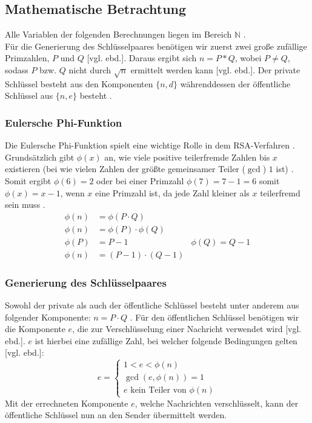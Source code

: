 \documentclass[a4paper,ngerman, headheight=28pt,12pt]{scrartcl}
\newcommand{\vcite}[1]{\cite[vgl.][]{#1}}
\newcommand{\vebd}{[vgl. ebd.]}
\begin{document}
\subsection{Mathematische Betrachtung}
Alle Variablen der folgenden Berechnungen liegen im Bereich $\mathbb{N}$ \vcite{RsaGenCond}. \\
Für die Generierung des Schlüsselpaares benötigen wir zuerst zwei große zufällige Primzahlen, $P$ und $Q$ \vebd. Daraus ergibt sich $n = P * Q$, wobei $P \neq Q$, sodass $P$ bzw. $Q$ nicht durch $\sqrt{n}$ ermittelt werden kann \vebd. Der private Schlüssel besteht aus den Komponenten $\{ n, d \}$ währenddessen der öffentliche Schlüssel aus $\{ n, e \}$ besteht \vcite{RsaVariables}.
\subsubsection{Eulersche Phi-Funktion}
Die Eulersche Phi-Funktion spielt eine wichtige Rolle in dem RSA-Verfahren \vcite{TotientFuncMultiplicative}. Grundsätzlich gibt $\phi(x)$ an, wie viele positive teilerfremde Zahlen bis $x$ existieren (bei wie vielen Zahlen der größte gemeinsamer Teiler ($\gcd$) $1$ ist) \vcite{EulersTotientFunction}. Somit ergibt $\phi(6) = 2$  oder bei einer Primzahl $\phi(7) = 7 - 1 = 6$ somit $\phi(x) = x-1$, wenn $x$ eine Primzahl ist, da jede Zahl kleiner als $x$ teilerfremd sein muss \vcite{TotientFuncMultiplicative}.
\begin{equation*}
  \begin{aligned}
    \phi(n) & = \phi(P \cdot Q)                                                \\
    \phi(n) & = \phi(P) \cdot \phi(Q)                                          \\
    \phi(P) & = P -1                                          & \phi(Q) = Q -1 \\
    \phi(n) & = \left(P - 1 \right) \cdot \left( Q - 1\right)
  \end{aligned}
\end{equation*}
\subsubsection{Generierung des Schlüsselpaares}
Sowohl der private als auch der öffentliche Schlüssel besteht unter anderem aus folgender Komponente: $n = P \cdot Q$ \vcite{RsaMaths1}.
Für den öffentlichen Schlüssel benötigen wir die Komponente $e$, die zur Verschlüsselung einer Nachricht verwendet wird \vebd. $e$ ist hierbei eine zufällige Zahl, bei welcher folgende Bedingungen gelten \vebd:
\begin{equation*}
  e = \begin{cases}
    1 < e < \phi(n)      \\
    \gcd(e, \phi(n)) = 1 \\
    \text{$e$ kein Teiler von $\phi(n)$}
  \end{cases}
\end{equation*}
Mit der errechneten Komponente $e$, welche Nachrichten verschlüsselt, kann der öffentliche Schlüssel nun an den Sender übermittelt werden.
\end{document}
